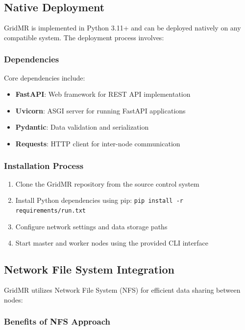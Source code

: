\documentclass[11pt,letterpaper,oneside]{article}
\begin{document}
\subsection{Native Deployment}

GridMR is implemented in Python 3.11+ and can be deployed natively on any compatible system. The deployment process involves:

\subsubsection{Dependencies}

Core dependencies include:
\begin{itemize}
    \item \textbf{FastAPI}: Web framework for REST API implementation
    \item \textbf{Uvicorn}: ASGI server for running FastAPI applications
    \item \textbf{Pydantic}: Data validation and serialization
    \item \textbf{Requests}: HTTP client for inter-node communication
\end{itemize}

\subsubsection{Installation Process}

\begin{enumerate}
    \item Clone the GridMR repository from the source control system
    \item Install Python dependencies using pip: \texttt{pip install -r requirements/run.txt}
    \item Configure network settings and data storage paths
    \item Start master and worker nodes using the provided CLI interface
\end{enumerate}

\subsection{Network File System Integration}

GridMR utilizes Network File System (NFS) for efficient data sharing between nodes:

\subsubsection{Benefits of NFS Approach}
\end{document}
